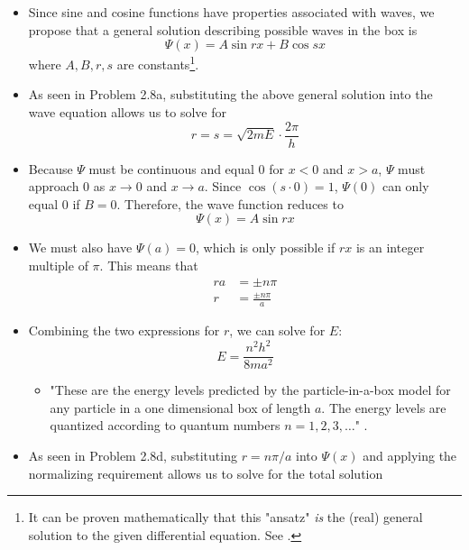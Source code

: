\documentclass[../notes.tex]{subfiles}
\begin{document}
\begin{itemize}
\begin{itemize}
        \item Since sine and cosine functions have properties associated with waves, we propose that a general solution describing possible waves in the box is
        \begin{equation*}
            \Psi(x) = A\sin rx+B\cos sx
        \end{equation*}
        where $A,B,r,s$ are constants\footnote{It can be proven mathematically that this "ansatz" \emph{is} the (real) general solution to the given differential equation. See \textcite{bib:MATH27300Notes}.}.
        \item As seen in Problem 2.8a, substituting the above general solution into the wave equation allows us to solve for
        \begin{equation*}
            r = s = \sqrt{2mE}\cdot\frac{2\pi}{h}
        \end{equation*}
        \item Because $\Psi$ must be continuous and equal 0 for $x<0$ and $x>a$, $\Psi$ must approach 0 as $x\to 0$ and $x\to a$. Since $\cos(s\cdot 0)=1$, $\Psi(0)$ can only equal 0 if $B=0$. Therefore, the wave function reduces to
        \begin{equation*}
            \Psi(x) = A\sin rx
        \end{equation*}
        \item We must also have $\Psi(a)=0$, which is only possible if $rx$ is an integer multiple of $\pi$. This means that
        \begin{align*}
            ra &= \pm n\pi\\
            r &= \frac{\pm n\pi}{a}
        \end{align*}
        \item Combining the two expressions for $r$, we can solve for $E$:
        \begin{equation*}
            E = \frac{n^2h^2}{8ma^2}
        \end{equation*}
        \begin{itemize}
            \item "These are the energy levels predicted by the particle-in-a-box model for any particle in a one dimensional box of length $a$. The energy levels are quantized according to quantum numbers $n=1,2,3,\dots$" \parencite[17]{bib:MiesslerFischerTarr}.
        \end{itemize}
        \item As seen in Problem 2.8d, substituting $r=n\pi/a$ into $\Psi(x)$ and applying the normalizing requirement allows us to solve for the total solution

\end{itemize}
\end{itemize}
\end{document}
